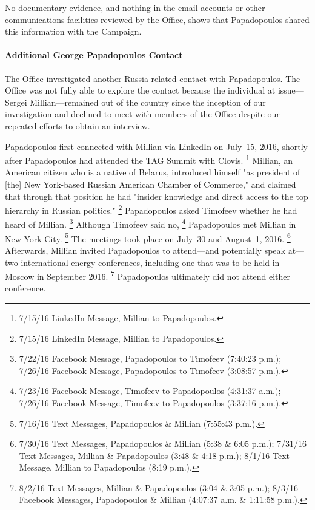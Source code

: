 No documentary evidence, and nothing in the email accounts or other communications facilities reviewed by the Office, shows that Papadopoulos shared this information with the Campaign.

\paragraph{Additional George Papadopoulos Contact}

The Office investigated another Russia-related contact with Papadopoulos.
The Office was not fully able to explore the contact because the individual at issue---Sergei Millian---remained out of the country since the inception of our investigation and declined to meet with members of the Office despite our repeated efforts to obtain an interview.

Papadopoulos first connected with Millian via LinkedIn on July~15, 2016, shortly after Papadopoulos had attended the TAG Summit with Clovis.%
\footnote{7/15/16 LinkedIn Message, Millian to Papadopoulos.}
Millian, an American citizen who is a native of Belarus, introduced himself "as president of [the] New York-based Russian American Chamber of Commerce," and claimed that through that position he had "insider knowledge and direct access to the top hierarchy in Russian politics."%
\footnote{7/15/16 LinkedIn Message, Millian to Papadopoulos.}
Papadopoulos asked Timofeev whether he had heard of Millian.%
\footnote{7/22/16 Facebook Message, Papadopoulos to Timofeev (7:40:23 p.m.);
7/26/16 Facebook Message, Papadopoulos to Timofeev (3:08:57 p.m.).}
Although Timofeev said no,%
\footnote{7/23/16 Facebook Message, Timofeev to Papadopoulos (4:31:37 a.m.);
7/26/16 Facebook Message, Timofeev to Papadopoulos (3:37:16 p.m.).}
Papadopoulos met Millian in New York City.%
\footnote{7/16/16 Text Messages, Papadopoulos \& Millian (7:55:43 p.m.).}
The meetings took place on July~30 and August~1, 2016.%
\footnote{7/30/16 Text Messages, Papadopoulos \& Millian (5:38 \& 6:05 p.m.);
7/31/16 Text Messages, Millian \& Papadopoulos (3:48 \& 4:18 p.m.);
8/1/16 Text Message, Millian to Papadopoulos (8:19 p.m.).}
Afterwards, Millian invited Papadopoulos to attend---and potentially speak at---two international energy conferences, including one that was to be held in Moscow in September 2016.%
\footnote{8/2/16 Text Messages, Millian \& Papadopoulos (3:04 \& 3:05 p.m.);
8/3/16 Facebook Messages, Papadopoulos \& Millian (4:07:37 a.m. \& 1:11:58 p.m.).}
Papadopoulos ultimately did not attend either conference.

